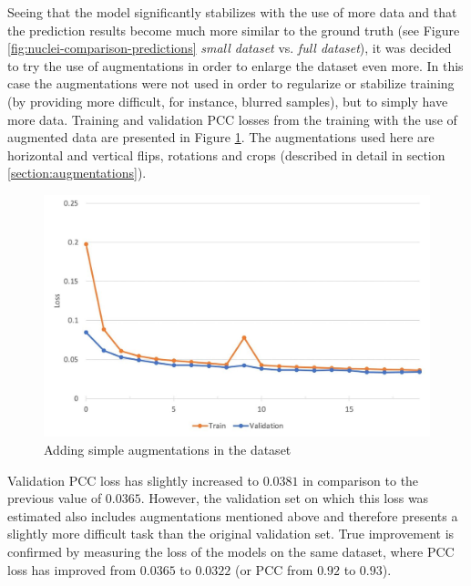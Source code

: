 Seeing that the model significantly stabilizes with the use of more data and that the prediction results become much more similar to the ground truth (see Figure \ref{fig:nuclei-comparison-predictions} \textit{small dataset} vs. \textit{full dataset}), it was decided to try the use of augmentations in order to enlarge the dataset even more. In this case the augmentations were not used in order to regularize or stabilize training (by providing more difficult, for instance, blurred samples), but to simply have more data. Training and validation PCC losses from the training with the use of augmented data are presented in Figure \ref{fig:no-reg-augmented}. The augmentations used here are horizontal and vertical flips, rotations and crops (described in detail in section \ref{section:augmentations}).
\begin{figure}[H]
	\begin{center}
		\includegraphics[width=0.5\linewidth]{bilder/nuclei/no-reg-but-aug.jpg}
		\caption{Adding simple augmentations in the dataset}\label{fig:no-reg-augmented}
	\end{center}
\end{figure}
Validation PCC loss has slightly increased to $0.0381$ in comparison to the previous value of $0.0365$. However, the validation set on which this loss was estimated also includes augmentations mentioned above and therefore presents a slightly more difficult task than the original validation set. True improvement is confirmed by measuring the loss of the models on the same dataset, where PCC loss has improved from $0.0365$ to $0.0322$ (or PCC from $0.92$ to $0.93$).

